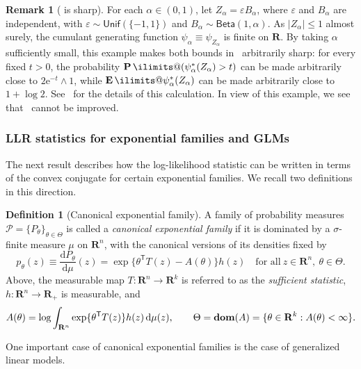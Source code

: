 \documentclass[11pt, letterpaper, hidelinks]{article}
\makeatletter
\newcommand{\R}{\mathbf R}
\newcommand{\cP}{\mathcal{P}}
\newcommand{\twomin}[2]{\ensuremath{#1 \land #2}}
\newcommand{\e}{\mathrm{e}}
\newcommand{\ud}[0]{\mathrm{d}}
\newcommand{\1}{\mathbf 1}
\newcommand{\eps}{\varepsilon}
\renewcommand{\leq}{\leqslant}
\DeclareMathOperator{\dom}{\bf dom}
\newcommand{\T}{\mathsf{T}}
\newcommand{\E}{\operatorname*{\mathbf{E}}\ilimits@}
\renewcommand{\P}{\operatorname*{\mathbf{P}}\ilimits@}
\theoremstyle{plain}
\theoremstyle{definition}
\newtheorem{definition}{Definition}[section]
\newtheorem{remark}{Remark}[section]
\newcommand{\defn}{=}
\makeatother
\begin{document}
\begin{remark}[ is sharp] 
\label{rem:sharpness-of-1d-cgf-trick}
For each $\alpha \in (0, 1)$, let $Z_\alpha = \eps B_\alpha$, where $\eps$ and $B_\alpha$ are independent, with $\eps \sim \mathsf{Unif}(\{-1, 1\})$ and $B_\alpha \sim \mathsf{Beta}(1, \alpha)$. As $|Z_\alpha| \leq 1$ almost surely, the cumulant generating function $\psi_\alpha \equiv \psi_{Z_\alpha}$ is finite on $\R$.
By taking $\alpha$ sufficiently small, this example makes both bounds in~ arbitrarily sharp: for every fixed $t>0$, the probability $\P(\psi_\alpha^\ast(Z_\alpha)>t)$ can be made arbitrarily close to $\twomin{2\e^{-t}}{1}$, while $\E\psi_\alpha^\ast(Z_\alpha)$ can be made arbitrarily close to $1+\log 2$.
See~ for the details of this calculation.
In view of this example, we see that~ cannot be improved.
\end{remark}

\subsubsection{LLR statistics for  exponential families and GLMs}
\label{sec:log-likelihood-stat}

The next result describes how the log-likelihood statistic can be written in terms of the convex conjugate for certain exponential families. We recall two definitions in this direction. 

\begin{definition}[Canonical exponential family]
A family of probability measures $\cP = \{P_\theta\}_{\theta \in \Theta}$ is called a \emph{canonical exponential family} if it is dominated by a $\sigma$-finite measure $\mu$ on $\R^n$, with the canonical versions of its densities fixed by
\[
p_\theta(z) \equiv \frac{\ud P_\theta}{\ud \mu}(z) = \exp\big\{\theta^\T T(z) - A(\theta) \big\} h(z) \quad \mbox{for all}~z \in \R^n,~\theta\in\Theta.
\]
Above, the measurable map $T \colon \R^n \to \R^k$ is referred to as the \emph{sufficient statistic}, $h \colon \R^n \to \R_+$ is measurable, and
\[
A(\theta)\defn\log\int_{\R^n}\exp\{\theta^\T T(z)\}h(z)\,\ud\mu(z),
\qquad
\Theta\defn\dom(A)=\{\theta\in\R^k:A(\theta)<\infty\}.
\]
\end{definition}

One important case of canonical exponential families is the case of generalized linear models.
\end{document}
